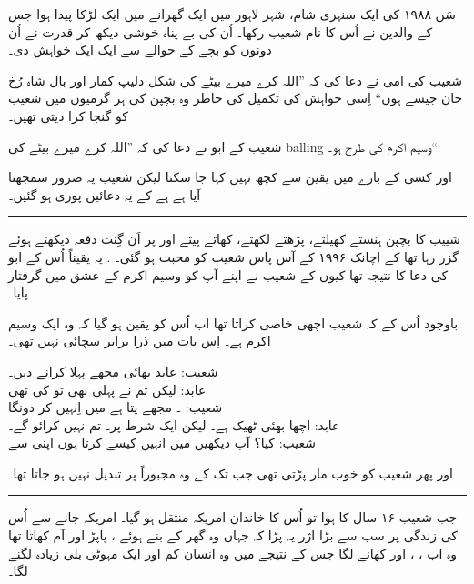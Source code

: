 \documentclass{article}
\begin{document}
\begin{center} \Large
\end{center}

سَن ۱۹۸۸ کی ایک سنہری شام، شہر لاہور میں ایک گھرانے میں ایک لڑکا پیدا ہوا جس کے والدین نے اُس کا نام شعیب رکھا۔ اُن کی بے پناہ خوشی دیکھ کر قدرت نے اُن دونوں کو بچے کے حوالے سے ایک ایک خواہش دی۔ 

شعیب کی امی نے دعا کی کہ ''اللہ کرے میرے بیٹے کی شکل دلیپ کمار اور بال شاہ رُخ خان جیسے ہوں`` اِسی خواہش کی تکمیل کی خاطر وہ بچپن کی ہر گرمیوں میں شعیب کو گنجا کرا دیتی تھیں۔ \textit{}

شعیب کے ابو نے دعا کی کہ ''اللہ کرے میرے بیٹے کی balling وسیم اکرم کی طرح ہو۔``

اور کسی کے بارے میں یقین سے کچھ نہیں کہا جا سکتا لیکن شعیب یہ ضرور سمجھتا آیا ہے ہے کے یہ دعائیں پوری ہو گئیں۔

\rule{\textwidth}{1pt}

شییب کا بچپن ہنستے کھیلتے، پڑھتے لکھتے،  کھاتے پیتے اور  پر اَن گِنت دفعہ  دیکھتے ہوئے گزر رہا تھا کے اچانک ۱۹۹۶ کے آس پاس شعیب کو محبت ہو گئی۔ . یہ یقیناً اُس کے ابو کی دعا کا نتیجہ تھا کیوں کے شعیب نے اپنے آپ کو وسیم اکرم کے عشق میں گرفتار پایا۔

باوجود اُس کے کہ شعیب اچھی خاصی  کراتا تھا اب اُس کو یقین ہو گیا کہ وہ ایک  وسیم اکرم ہے۔ اِس بات میں ذرا برابر سچائی نہیں تھی۔


شعیب:  عابد بھائی مجھے پہلا  کرانے دیں۔\\
عابد: لیکن تم نے پہلی  بھی تو کی تھی\\
شعیب: ۔ مجھے پتا ہے میں اِنہیں  کر دونگا\\
عابد: اچھا بھئی ٹھیک ہے۔ لیکن ایک شرط پر۔ تم  نہیں کرائو گے۔\\
شعیب: کیا؟ آپ دیکھیں میں انہیں کیسے  کرتا ہوں اپنی  سے

اور پھر شعیب کو خوب مار پڑتی تھی جب تک کے وہ مجبوراً  پر تبدیل نہیں ہو جاتا تھا۔

\rule{\textwidth}{1pt}

جب شعیب ۱۶ سال کا ہوا تو اُس کا خاندان امریکہ منتقل ہو گیا۔ امریکہ جانے سے اُس کی زندگی پر سب سے بڑا اژر یہ پڑا کہ جہاں وہ گھر کے بنے ہوئے ، پاپڑ اور آم کھاتا تھا وہ اب ، ، اور  کھانے لگا جس کے نتیجے میں وہ انسان کم اور ایک مہوٹی بلی زیادہ لگنے لگا۔  

\end{document}
